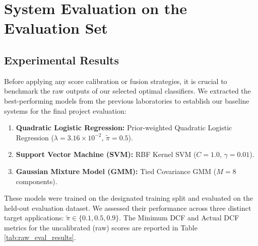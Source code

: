 \chapter{System Evaluation on the Evaluation Set}
\label{chap:system_evaluation}

\section{Experimental Results}
Before applying any score calibration or fusion strategies, it is crucial to benchmark the raw outputs of our selected optimal classifiers. We extracted the best-performing models from the previous laboratories to establish our baseline systems for the final project evaluation:
\begin{enumerate}
    \item \textbf{Quadratic Logistic Regression:} Prior-weighted Quadratic Logistic Regression ($\lambda=3.16 \times 10^{-2}$, $\tilde{\pi}=0.5$).
    \item \textbf{Support Vector Machine (SVM):} RBF Kernel SVM ($C=1.0$, $\gamma=0.01$).
    \item \textbf{Gaussian Mixture Model (GMM):} Tied Covariance GMM ($M=8$ components).
\end{enumerate}

These models were trained on the designated training split and evaluated on the held-out evaluation dataset. We assessed their performance across three distinct target applications: $\tilde{\pi} \in \{0.1, 0.5, 0.9\}$. The Minimum DCF and Actual DCF metrics for the uncalibrated (raw) scores are reported in Table \ref{tab:raw_eval_results}.

\begin{table}[H]
    \centering
    \caption{Baseline Performance (Raw Scores) on the Evaluation Set.}
    \label{tab:raw_eval_results}
\end{table}

